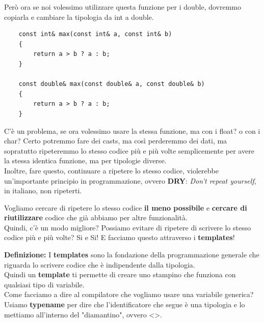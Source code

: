 \textsf{\small Però ora se noi volessimo utilizzare questa funzione per i double, dovremmo copiarla e cambiare la tipologia da int a double.} \\

\begin{lstlisting}
	const int& max(const int& a, const int& b)
	{
		return a > b ? a : b;
	}

	const double& max(const double& a, const double& b)
	{
		return a > b ? a : b;
	}
\end{lstlisting}

\textsf{\small C'è un problema, se ora volessimo usare la stessa funzione, ma con i float? o con i char? Certo potremmo fare dei casts, ma così perderemmo dei dati, ma sopratutto ripeteremmo lo stesso codice più e più volte semplicemente per avere la stessa identica funzione, ma per tipologie diverse.} \\

\textsf{\small Inoltre, fare questo, continuare a ripetere lo stesso codice, violerebbe un'importante principio in programmazione, ovvero \textbf{DRY}: \emph{Don't repeat yourself}, in italiano, non ripeterti.} \break 

\textsf{\small Vogliamo cercare di ripetere lo stesso codice \textbf{il meno possibile} e \textbf{cercare di riutilizzare} codice che già abbiamo per altre funzionalità.} \\

\textsf{\small Quindi, c'è un modo migliore? Possiamo evitare di ripetere di scrivere lo stesso codice più e più volte? Si e Si! E facciamo questo attraverso i \textbf{templates}!} \break

\textsf{\small \textbf{Definizione:} I \textbf{templates} sono la fondazione della programmazione generale che riguarda lo scrivere codice che è indipendente dalla tipologia. } \\

\textsf{\small Quindi un \textbf{template} ti permette di creare uno stampino che funziona con qualsiasi tipo di variabile.} \\

\textsf{\small Come facciamo a dire al compilatore che vogliamo usare una variabile generica? Usiamo \textbf{typename} per dire che l'identificatore che segue è una tipologia e lo mettiamo all'interno del "diamantino", ovvero <>.} \\

\textsf{\small }

